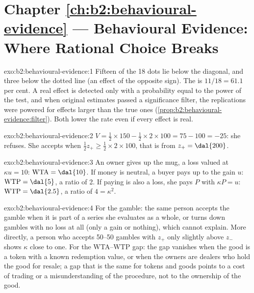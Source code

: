 \section*{Chapter \ref{ch:b2:behavioural-evidence} --- Behavioural Evidence: Where Rational Choice Breaks}

\begin{solution}{exo:b2:behavioural-evidence:1}
Fifteen of the 18 dots lie below the diagonal, and three below the dotted line (an effect of the opposite
sign). The  is $11/18 = 61.1$ per cent. A real effect is detected only with a
probability equal to the power of the test, and when original estimates passed a significance filter,
the replications were powered for effects larger than the true ones
(\cref{prop:b2:behavioural-evidence:filter}). Both lower the rate even if every effect is real.
\end{solution}

\begin{solution}{exo:b2:behavioural-evidence:2}
$V = \tfrac12 \times 150 - \tfrac12 \times 2 \times 100 = 75 - 100 = -25$: she refuses. She accepts when
$\tfrac12 z_+ \ge \tfrac12 \times 2 \times 100$, that is from $z_+ = \dal{200}$.
\end{solution}

\begin{solution}{exo:b2:behavioural-evidence:3}
An owner gives up the mug, a loss valued at $\kappa u = 10$: $\mathrm{WTA} = \dal{10}$. If money is
neutral, a buyer pays up to the gain $u$: $\mathrm{WTP} = \dal{5}$, a ratio of 2. If paying is also a
loss, she pays $P$ with $\kappa P = u$: $\mathrm{WTP} = \dal{2.5}$, a ratio of $4 = \kappa^2$.
\end{solution}

\begin{solution}{exo:b2:behavioural-evidence:4}
For the gamble: the same person accepts the gamble when it is part of a series she evaluates as a whole,
or turns down gambles with no loss at all (only a gain or nothing), which  cannot explain.
More directly, a person who accepts 50--50 gambles with $z_+$ only slightly above $z_-$ shows $\kappa$
close to one. For the WTA--WTP gap: the gap vanishes when the good is a token with a known redemption
value, or when the owners are dealers who hold the good for resale; a gap that is the same for tokens
and goods points to a cost of trading or a misunderstanding of the procedure, not to the ownership of
the good.
\end{solution}

